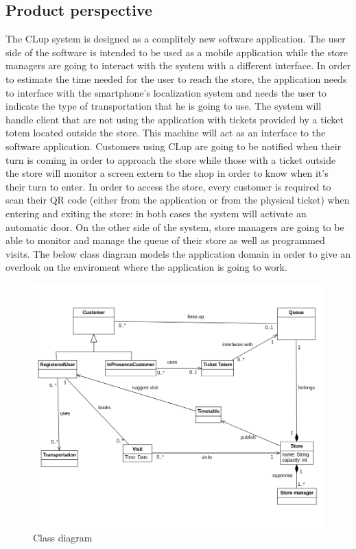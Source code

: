 \documentclass[]{article}
\begin{document}
		\subsection{Product perspective}
		The CLup system is designed as a complitely new software application. The user side of the software is intended to be used as a mobile application while the store managers are going to interact with the system with a different interface. \newline
		In order to estimate the time needed for the user to reach the store, the application needs to interface with the smartphone's localization system and needs the user to indicate the type of transportation that he is going to use. \newline
		The system will handle client that are not using the application with tickets provided by a ticket totem located outside the store. This machine will act as an interface to the software application. \newline
		Customers using CLup are going to be notified when their turn is coming in order to approach the store while those with a ticket outside the store will monitor a screen extern to the shop in order to know when it's their turn to enter. \newline
		In order to access the store, every customer is required to scan their QR code (either from the application or from the physical ticket) when entering and exiting the store: in both cases the system will activate an automatic door. \newline
		On the other side of the system, store managers are going to be able to monitor and manage the queue of their store as well as programmed visits. \newline
		The below class diagram models the application domain in order to give an overlook on the enviroment where the application is going to work.
		
		\begin{figure}[htp]
			\centering
			\includegraphics[scale=0.5]{UML_class_diagram.png}
			\caption{Class diagram}
			\label{fig:class_diagram}
		\end{figure}
		
\end{document}
